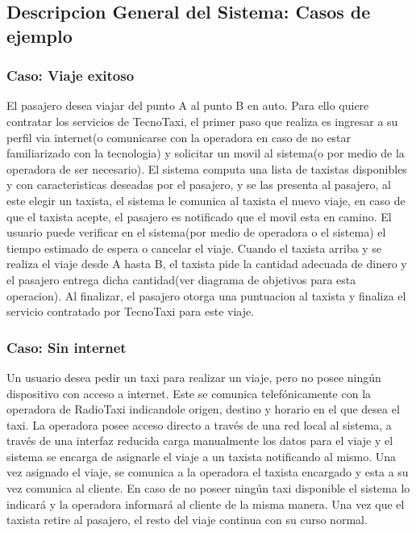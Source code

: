 \subsection{Descripcion General del Sistema: Casos de ejemplo}
	\subsubsection{Caso: Viaje exitoso}
	El pasajero desea viajar del punto A al punto B en auto. Para ello quiere contratar los servicios de TecnoTaxi, el primer paso que realiza es ingresar a su perfil via internet(o comunicarse con la operadora en caso de no estar familiarizado con la tecnologia) y solicitar un movil al sistema(o por medio de la operadora de ser necesario). El sistema computa una lista de taxistas disponibles y con caracteristicas deseadas por el pasajero, y se las presenta al pasajero, al este elegir un taxista, el sistema le comunica al taxista el nuevo viaje, en caso de que el taxista acepte, el pasajero es notificado que el movil esta en camino. El usuario puede verificar en el sistema(por medio de operadora o el sistema) el tiempo estimado de espera o cancelar el viaje. Cuando el taxista arriba y se realiza el viaje desde A hasta B, el taxista pide la cantidad adecuada de dinero y el pasajero entrega dicha cantidad(ver diagrama de objetivos para esta operacion). Al finalizar, el pasajero otorga una puntuacion al taxista y finaliza el servicio contratado por TecnoTaxi para este viaje.

	\subsubsection{Caso: Sin internet}
	Un usuario desea pedir un taxi para realizar un viaje, pero no posee ningún dispositivo con acceso a internet. Este se comunica telefónicamente con la operadora de RadioTaxi indicandole origen, destino y horario en el que desea el taxi. La operadora posee acceso directo a través de una red local al sistema, a través de una interfaz reducida carga manualmente los datos para el viaje y el sistema se encarga de asignarle el viaje a un taxista notificando al mismo. Una vez asignado el viaje, se comunica a la operadora el taxista encargado y esta a su vez comunica al cliente. En caso de no poseer ningún taxi disponible el sistema lo indicará y la operadora informará al cliente de la misma manera. Una vez que el taxista retire al pasajero, el resto del viaje continua con su curso normal.

